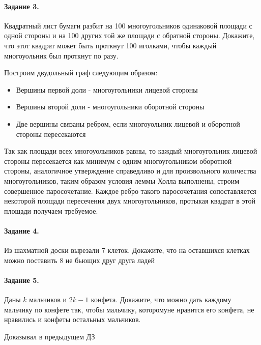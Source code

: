 \documentclass[a4paper,12pt]{article}
\begin{document}
\paragraph{Задание 3.} Квадратный лист бумаги разбит на 100 многоугольников одинаковой площади с одной стороны и на 100 других той же площади с обратной стороны. Докажите, что этот квадрат может быть проткнут 100 иголками, чтобы каждый многоуольник был проткнут по разу.
\begin{Solution}
Построим двудольный граф следующим образом:
\begin{itemize}
\item Вершины первой доли - многоугольники лицевой стороны

\item Вершины второй доли - многоугольники оборотной стороны

\item Две вершины связаны ребром, если многоуольник лицевой и оборотной стороны пересекаются
\end{itemize}
Так как площади всех многоуольников равны, то каждый многоугольник лицевой стороны пересекается как минимум с одним многоугольником оборотной стороны, аналогичное утверждение справедливо и для произвольного количества многоугольников, таким образом условия леммы Холла выполнены, строим совершенное паросочетание. Каждое ребро такого паросочетания сопоставляется некоторой площади пересечения двух многоугольников, протыкая квадрат в этой площади получаем требуемое.
\end{Solution}

\paragraph{Задание 4. } Из шахматной доски вырезали 7 клеток. Докажите, что на оставшихся клетках можно поставить 8 не бьющих друг друга ладей

\begin{Solution}
\end{Solution}

\paragraph{Задание 5.} Даны $k$ мальчиков и $2k-1$ конфета. Докажите, что можно дать каждому мальчику по конфете так, чтобы мальчику, которомуне нравится его конфета, не нравились и конфеты остальных мальчиков.

\begin{Solution}
Доказывал в предыдущем ДЗ
\end{Solution}
\end{document}
